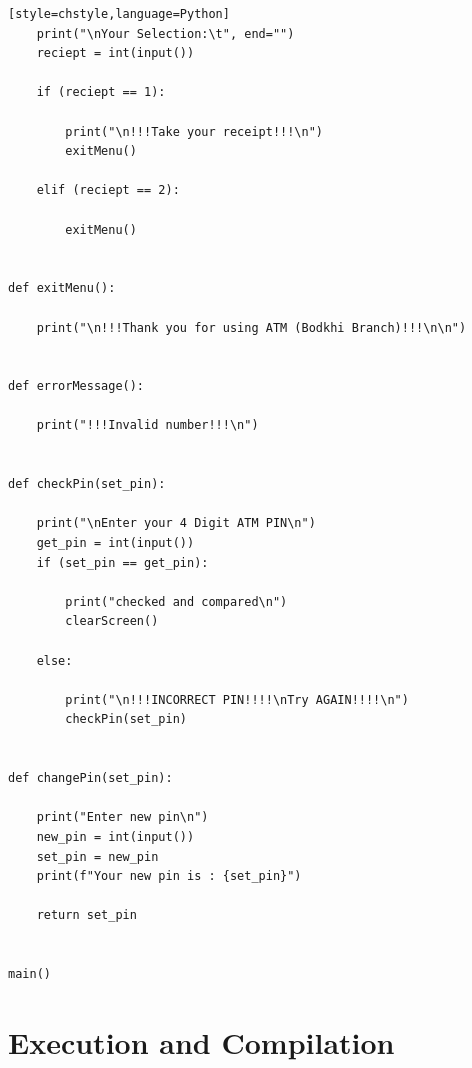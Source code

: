 \documentclass{article}
\begin{document}
\begin{verbatim}[style=chstyle,language=Python]
    print("\nYour Selection:\t", end="")
    reciept = int(input())

    if (reciept == 1):

        print("\n!!!Take your receipt!!!\n")
        exitMenu()

    elif (reciept == 2):

        exitMenu()


def exitMenu():

    print("\n!!!Thank you for using ATM (Bodkhi Branch)!!!\n\n")


def errorMessage():

    print("!!!Invalid number!!!\n")


def checkPin(set_pin):

    print("\nEnter your 4 Digit ATM PIN\n")
    get_pin = int(input())
    if (set_pin == get_pin):

        print("checked and compared\n")
        clearScreen()

    else:

        print("\n!!!INCORRECT PIN!!!!\nTry AGAIN!!!!\n")
        checkPin(set_pin)


def changePin(set_pin):

    print("Enter new pin\n")
    new_pin = int(input())
    set_pin = new_pin
    print(f"Your new pin is : {set_pin}")

    return set_pin


main()

\end{verbatim}
\newpage
\section{Execution and Compilation}
\end{document}
